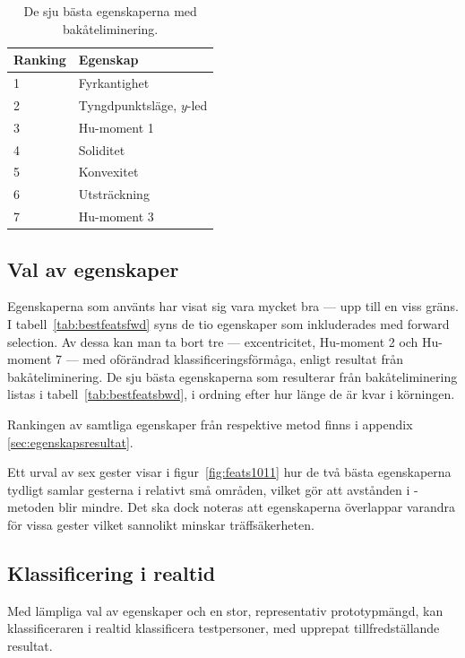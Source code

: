 \documentclass[../rapport_MVEX01-11-05]{subfiles}
\begin{document}
\begin{table}[tb]
	\centering
    \caption{De sju bästa egenskaperna med bakåteliminering.}
	
	\label{tab:bestfeatsbwd}
	\begin{tabular}{ll}
		\toprule
		Ranking & Egenskap \\
		\midrule
                1 & Fyrkantighet \\
                2 & Tyngdpunktsläge, $y$-led \\
                3 & Hu-moment 1\\
                4 & Soliditet\\
                5 & Konvexitet \\
                6 & Utsträckning \\
                7 & Hu-moment 3 \\
		\bottomrule
	\end{tabular}
\end{table}

\subsection{Val av egenskaper}\label{sec:resultat_features}
Egenskaperna som använts har visat sig vara mycket bra --- upp till en viss gräns.
I tabell~\vref{tab:bestfeatsfwd} syns de tio egenskaper som inkluderades
med forward selection. Av dessa kan man ta bort tre --- excentricitet,
Hu-moment 2 och Hu-moment 7 ---
med oförändrad klassificeringsförmåga, enligt resultat från bakåteliminering.
De sju bästa egenskaperna som resulterar från
bakåteliminering listas i tabell~\vref{tab:bestfeatsbwd}, i
ordning efter hur länge de är kvar i körningen.

Rankingen av samtliga egenskaper från respektive metod finns i appendix
\ref{sec:egenskapsresultat}.

Ett urval av sex gester visar i
figur~\vref{fig:feats1011} hur de två bästa egenskaperna tydligt samlar 
gesterna i relativt små områden, vilket gör att avstånden i \knn-metoden 
blir mindre. Det ska dock noteras att egenskaperna 
överlappar varandra för vissa gester vilket sannolikt minskar träffsäkerheten.

\subsection{Klassificering i realtid}
Med lämpliga val av egenskaper och en stor, representativ prototypmängd,
kan klassificeraren i realtid klassificera testpersoner, med upprepat
tillfredställande resultat.
\end{document}
